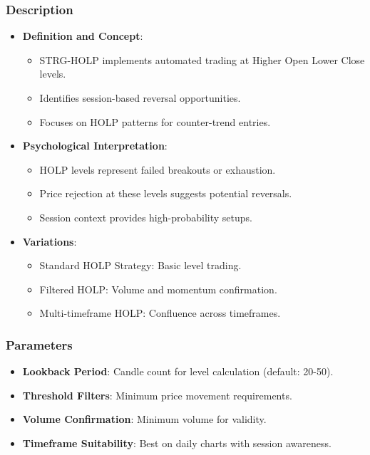 \documentclass[12pt]{article}
\begin{document}
\subsubsection{Description}
\begin{itemize}
\item \textbf{Definition and Concept}:
  \begin{itemize}
  \item STRG-HOLP implements automated trading at Higher Open Lower Close levels.
  \item Identifies session-based reversal opportunities.
  \item Focuses on HOLP patterns for counter-trend entries.
  \end{itemize}
\item \textbf{Psychological Interpretation}:
  \begin{itemize}
  \item HOLP levels represent failed breakouts or exhaustion.
  \item Price rejection at these levels suggests potential reversals.
  \item Session context provides high-probability setups.
  \end{itemize}
\item \textbf{Variations}:
  \begin{itemize}
  \item Standard HOLP Strategy: Basic level trading.
  \item Filtered HOLP: Volume and momentum confirmation.
  \item Multi-timeframe HOLP: Confluence across timeframes.
  \end{itemize}
\end{itemize}

\subsubsection{Parameters}
\begin{itemize}
\item \textbf{Lookback Period}: Candle count for level calculation (default: 20-50).
\item \textbf{Threshold Filters}: Minimum price movement requirements.
\item \textbf{Volume Confirmation}: Minimum volume for validity.
\item \textbf{Timeframe Suitability}: Best on daily charts with session awareness.
\end{itemize}
\end{document}
